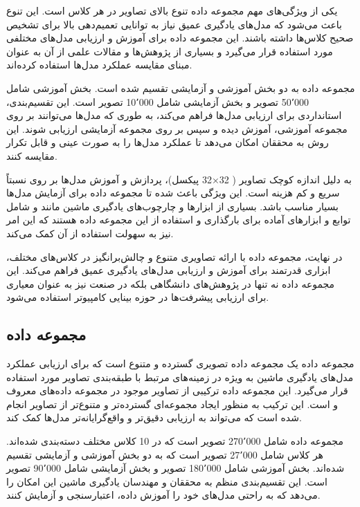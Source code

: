 یکی از ویژگی‌های مهم مجموعه داده
تنوع بالای تصاویر در هر کلاس است. این تنوع باعث می‌شود که مدل‌های یادگیری عمیق نیاز به توانایی تعمیم‌دهی بالا برای تشخیص صحیح کلاس‌ها داشته باشند. این مجموعه داده برای آموزش و ارزیابی مدل‌های مختلفی مورد استفاده قرار می‌گیرد و بسیاری از پژوهش‌ها و مقالات علمی از آن به عنوان مبنای مقایسه عملکرد مدل‌ها استفاده کرده‌اند.

مجموعه داده
به دو بخش آموزشی و آزمایشی تقسیم شده است. بخش آموزشی شامل 50٬000 تصویر و بخش آزمایشی شامل 10٬000 تصویر است. این تقسیم‌بندی، استانداردی برای ارزیابی مدل‌ها فراهم می‌کند، به طوری که مدل‌ها می‌توانند بر روی مجموعه آموزشی، آموزش دیده و سپس بر روی مجموعه آزمایشی ارزیابی شوند. این روش به محققان امکان می‌دهد تا عملکرد مدل‌ها را به صورت عینی و قابل تکرار مقایسه کنند.

به دلیل اندازه کوچک تصاویر (%
32$\times$32
پیکسل)، پردازش و آموزش مدل‌ها بر روی
نسبتاً سریع و کم هزینه است. این ویژگی باعث شده تا مجموعه داده 
برای آزمایش مدل‌ها بسیار مناسب باشد. بسیاری از ابزارها و چارچوب‌های%
یادگیری ماشین مانند
و
شامل توابع و ابزارهای آماده برای بارگذاری و استفاده از این مجموعه داده هستند که این امر نیز به سهولت استفاده از آن کمک می‌کند.

در نهایت، مجموعه داده
با ارائه تصاویری متنوع و چالش‌برانگیز در کلاس‌های مختلف، ابزاری قدرتمند برای آموزش و ارزیابی مدل‌های یادگیری عمیق فراهم می‌کند. این مجموعه داده نه تنها در پژوهش‌های دانشگاهی بلکه در صنعت نیز به عنوان معیاری برای ارزیابی پیشرفت‌ها در حوزه بینایی کامپیوتر استفاده می‌شود.


\subsection{
	مجموعه داده
}
مجموعه داده
یک مجموعه داده تصویری گسترده و متنوع است که برای ارزیابی عملکرد مدل‌های یادگیری ماشین به ویژه در زمینه‌های مرتبط با طبقه‌بندی تصاویر مورد استفاده قرار می‌گیرد. این مجموعه داده ترکیبی از تصاویر موجود در مجموعه‌ داده‌های معروف
و
است. این ترکیب به منظور ایجاد مجموعه‌ای گسترده‌تر و متنوع‌تر از تصاویر انجام شده است که می‌تواند به ارزیابی دقیق‌تر و واقع‌گرایانه‌تر مدل‌ها کمک کند.

مجموعه داده
شامل 270٬000 تصویر است که در 10 کلاس مختلف دسته‌بندی شده‌اند. هر کلاس شامل 27٬000 تصویر است که به دو بخش آموزشی و آزمایشی تقسیم شده‌اند. بخش آموزشی شامل 180٬000 تصویر و بخش آزمایشی شامل 90٬000 تصویر است. این تقسیم‌بندی منظم به محققان و مهندسان یادگیری ماشین این امکان را می‌دهد که به راحتی مدل‌های خود را آموزش داده، اعتبارسنجی و آزمایش کنند.

